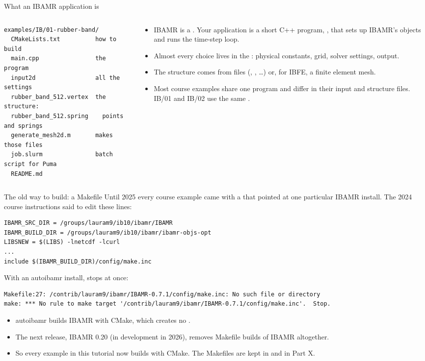 \documentclass[aspectratio=169,11pt]{beamer}
\begin{document}
\begin{frame}[fragile]{What an IBAMR application is}
\begin{columns}[T,onlytextwidth]
\begin{column}{0.49\textwidth}
\begin{lstlisting}
examples/IB/01-rubber-band/
  CMakeLists.txt          how to build
  main.cpp                the program
  input2d                 all the settings
  rubber_band_512.vertex  the structure:
  rubber_band_512.spring    points and springs
  generate_mesh2d.m       makes those files
  job.slurm               batch script for Puma
  README.md
\end{lstlisting}
\end{column}
\begin{column}{0.48\textwidth}
\begin{itemize}\small
  \item IBAMR is a . Your application is a short C++ program, , that sets up IBAMR's objects and runs the time-step loop.
  \item Almost every choice lives in the : physical constants, grid, solver settings, output.
  \item The structure comes from files (, , \ldots) or, for IBFE, a finite element mesh.
  \item Most course examples share one program and differ in their input and structure files. IB/01 and IB/02 use the same .
\end{itemize}
\end{column}
\end{columns}
\end{frame}

\begin{frame}[fragile]{The old way to build: a Makefile}
Until 2025 every course example came with a  that pointed at one particular IBAMR install. The 2024 course instructions said to edit these lines:
\begin{lstlisting}[style=shell]
IBAMR_SRC_DIR = /groups/lauram9/ib10/ibamr/IBAMR
IBAMR_BUILD_DIR = /groups/lauram9/ib10/ibamr/ibamr-objs-opt
LIBSNEW = $(LIBS) -lnetcdf -lcurl
...
include $(IBAMR_BUILD_DIR)/config/make.inc
\end{lstlisting}
With an autoibamr install,  stops at once:
\begin{lstlisting}
Makefile:27: /contrib/lauram9/ibamr/IBAMR-0.7.1/config/make.inc: No such file or directory
make: *** No rule to make target '/contrib/lauram9/ibamr/IBAMR-0.7.1/config/make.inc'.  Stop.
\end{lstlisting}
\begin{itemize}\small
  \item autoibamr builds IBAMR with CMake, which creates no .
  \item The next release, IBAMR 0.20 (in development in 2026), removes Makefile builds of IBAMR altogether.
  \item So every example in this tutorial now builds with CMake. The Makefiles are kept in  and in Part X.
\end{itemize}
\end{frame}
\end{document}
